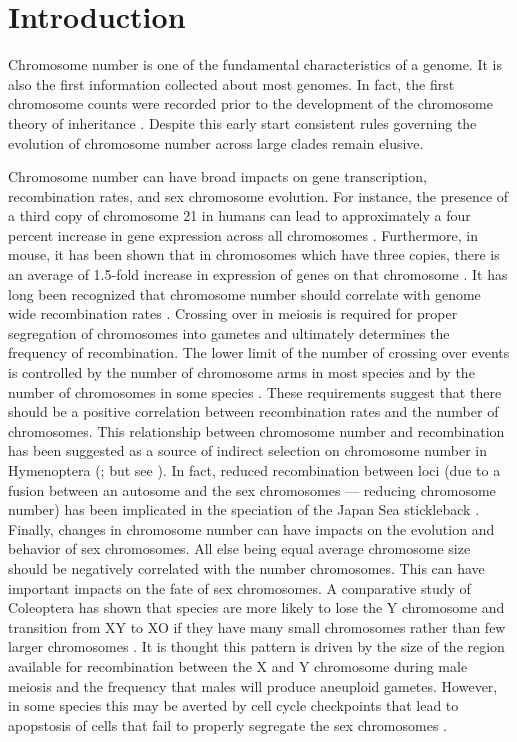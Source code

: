\section{Introduction}
Chromosome number is one of the fundamental characteristics of a genome.
It is also the first information collected about most genomes. 
In fact, the first chromosome counts were recorded prior to the development of the chromosome theory of inheritance \citep{flemming1882}.
Despite this early start consistent rules governing the evolution of chromosome number across large clades remain elusive. 

Chromosome number can have broad impacts on gene transcription, recombination rates, and sex chromosome evolution. 
For instance, the presence of a third copy of chromosome 21 in humans can lead to approximately a four percent increase in gene expression across all chromosomes \citep{lockstone2007}.
Furthermore, in mouse, it has been shown that in chromosomes which have three copies, there is an average of 1.5-fold increase in expression of genes on that chromosome \citep{williams2008aneuploidy}. 
It has long been recognized that chromosome number should correlate with genome wide recombination rates \citep{stebbins1958}.
Crossing over in meiosis is required for proper segregation of chromosomes into gametes and ultimately determines the frequency of recombination.
The lower limit of the number of crossing over events is controlled by the number of chromosome arms in most species and by the number of chromosomes in some species \citep{dumont2017req}.
These requirements suggest that there should be a positive correlation between recombination rates and the number of chromosomes. 
This relationship between chromosome number and recombination has been suggested as a source of indirect selection on chromosome number in Hymenoptera (\citealt{sherman1979}; but see \citealt{ross2015}).
In fact, reduced recombination between loci (due to a fusion between an autosome and the sex chromosomes --- reducing chromosome number) has been implicated in the speciation of the Japan Sea stickleback \citep{kitano2012}. 
Finally, changes in chromosome number can have impacts on the evolution and behavior of sex chromosomes. 
All else being equal average chromosome size should be negatively correlated with the number chromosomes.
This can have important impacts on the fate of sex chromosomes.
A comparative study of Coleoptera has shown that species are more likely to lose the Y chromosome and transition from XY to XO if they have many small chromosomes rather than few larger chromosomes \citep{blackmon2015bioessay}.
It is thought this pattern is driven by the size of the region available for recombination between the X and Y chromosome during male meiosis and the frequency that males will produce aneuploid gametes\citep{blackmon2014}.
However, in some species this may be averted by cell cycle checkpoints that lead to apopstosis of cells that fail to properly segregate the sex chromosomes \citep{dumont2017par}.

